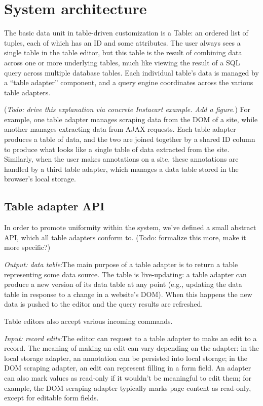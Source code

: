 \documentclass[sigplan,10pt,anonymous,review]{acmart}
\begin{document}
\hypertarget{system-architecture}{%
\section{System architecture}\label{system-architecture}}

The basic data unit in table-driven customization is a Table: an ordered
list of tuples, each of which has an ID and some attributes. The user
always sees a single table in the table editor, but this table is the
result of combining data across one or more underlying tables, much like
viewing the result of a SQL query across multiple database tables. Each
individual table's data is managed by a ``table adapter'' component, and
a query engine coordinates across the various table adapters.

(\emph{Todo: drive this explanation via concrete Instacart example. Add
a figure.}) For example, one table adapter manages scraping data from
the DOM of a site, while another manages extracting data from AJAX
requests. Each table adapter produces a table of data, and the two are
joined together by a shared ID column to produce what looks like a
single table of data extracted from the site. Similarly, when the user
makes annotations on a site, these annotations are handled by a third
table adapter, which manages a data table stored in the browser's local
storage.

\hypertarget{table-adapter-api}{%
\subsection{Table adapter API}\label{table-adapter-api}}

In order to promote uniformity within the system, we've defined a small
abstract API, which all table adapters conform to. (Todo: formalize this
more, make it more specific?)

\emph{Output: data table}:The main purpose of a table adapter is to
return a table representing some data source. The table is
live-updating: a table adapter can produce a new version of its data
table at any point (e.g., updating the data table in response to a
change in a website's DOM). When this happens the new data is pushed to
the editor and the query results are refreshed.

Table editors also accept various incoming commands.

\emph{Input: record edits}:The editor can request to a table adapter to
make an edit to a record. The meaning of making an edit can vary
depending on the adapter: in the local storage adapter, an annotation
can be persisted into local storage; in the DOM scraping adapter, an
edit can represent filling in a form field. An adapter can also mark
values as read-only if it wouldn't be meaningful to edit them; for
example, the DOM scraping adapter typically marks page content as
read-only, except for editable form fields.
\end{document}
